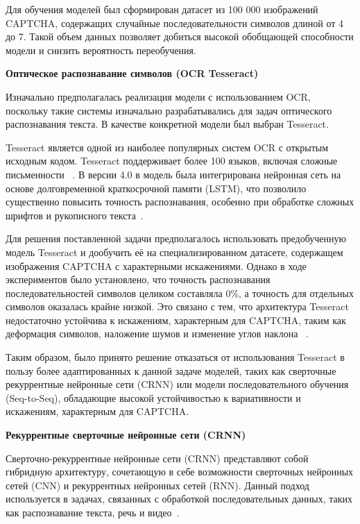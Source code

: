 Для обучения моделей был сформирован датасет из 100 000 изображений CAPTCHA, 
содержащих случайные последовательности символов длиной от 4 до 7. Такой объем 
данных позволяет добиться высокой обобщающей способности модели и снизить 
вероятность переобучения.

\textbf{Оптическое распознавание символов (OCR Tesseract)}

Изначально предполагалась реализация модели с использованием OCR, поскольку такие 
системы изначально разрабатывались для задач оптического распознавания текста. В 
качестве конкретной модели был выбран Tesseract.

Tesseract является одной из наиболее популярных систем OCR с открытым исходным 
кодом. Tesseract поддерживает более 100 языков, включая сложные письменности~
\cite{Klippa}. В версии 4.0 в модель была интегрирована нейронная сеть на основе 
долговременной краткосрочной памяти (LSTM), что позволило существенно повысить 
точность распознавания, особенно при обработке сложных шрифтов и рукописного 
текста~\cite{GitTesseract}.

Для решения поставленной задачи предполагалось использовать предобученную модель 
Tesseract и дообучить её на специализированном датасете, содержащем изображения 
CAPTCHA с характерными искажениями. Однако в ходе экспериментов было установлено, 
что точность распознавания последовательностей символов целиком составляла 0\%, а 
точность для отдельных символов оказалась крайне низкой. Это связано с тем, что 
архитектура Tesseract недостаточно устойчива к искажениям, характерным для 
CAPTCHA, таким как деформация символов, наложение шумов и изменение углов наклона
~\cite{TrainTesseract}.

Таким образом, было принято решение отказаться от использования Tesseract в 
пользу более адаптированных к данной задаче моделей, таких как сверточные 
рекуррентные нейронные сети (CRNN) или модели последовательного обучения 
(Seq-to-Seq), обладающие высокой устойчивостью к вариативности и искажениям, 
характерным для CAPTCHA.

\textbf{Рекуррентные сверточные нейронные сети (CRNN)}

Сверточно-рекуррентные нейронные сети (CRNN) представляют собой гибридную 
архитектуру, сочетающую в себе возможности сверточных нейронных сетей (CNN) и 
рекуррентных нейронных сетей (RNN). Данный подход используется в задачах, 
связанных с обработкой последовательных данных, таких как распознавание текста, 
речь и видео~\cite{CRNNHabr}.

